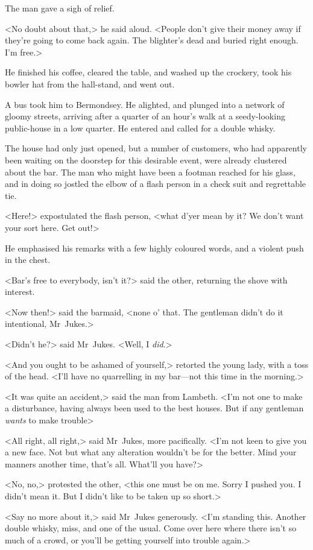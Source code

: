 The man gave a sigh of relief.

<No doubt about that,> he said aloud. <People don't give their money away if they're going to come back again. The blighter's dead and buried right enough. I'm free.>

He finished his coffee, cleared the table, and washed up the crockery, took his bowler hat from the hall-stand, and went out.

A bus took him to Bermondsey. He alighted, and plunged into a network of gloomy streets, arriving after a quarter of an hour's walk at a seedy-looking public-house in a low quarter. He entered and called for a double whisky.

The house had only just opened, but a number of customers, who had apparently been waiting on the doorstep for this desirable event, were already clustered about the bar. The man who might have been a footman reached for his glass, and in doing so jostled the elbow of a flash person in a check suit and regrettable tie.

<Here!> expostulated the flash person, <what d'yer mean by it? We don't want your sort here. Get out!>

He emphasised his remarks with a few highly coloured words, and a violent push in the chest.

<Bar's free to everybody, isn't it?> said the other, returning the shove with interest.

<Now then!> said the barmaid, <none o' that. The gentleman didn't do it intentional, Mr~Jukes.>

<Didn't he?> said Mr~Jukes. <Well, I \emph{did}.>

<And you ought to be ashamed of yourself,> retorted the young lady, with a toss of the head. <I'll have no quarrelling in my bar—not this time in the morning.>

<It was quite an accident,> said the man from Lambeth. <I'm not one to make a disturbance, having always been used to the best houses. But if any gentleman \emph{wants} to make trouble\longdash>

<All right, all right,> said Mr~Jukes, more pacifically. <I'm not keen to give you a new face. Not but what any alteration wouldn't be for the better. Mind your manners another time, that's all. What'll you have?>

<No, no,> protested the other, <this one must be on me. Sorry I pushed you. I didn't mean it. But I didn't like to be taken up so short.>

<Say no more about it,> said Mr~Jukes generously. <I'm standing this. Another double whisky, miss, and one of the usual. Come over here where there isn't so much of a crowd, or you'll be getting yourself into trouble again.>

